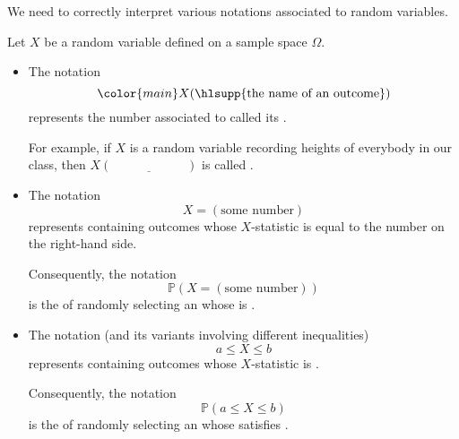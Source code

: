 \documentclass[../main.tex]{subfiles}
\begin{document}
We need to correctly interpret various notations associated to random variables.
\begin{definition} \label{def:random-variables}
  Let \(X\) be a random variable defined on a sample space \(\Omega\). 

  \begin{itemize}
    \item The notation 
      \[
        {\color{main} X(\text{\hlsupp{the name of an outcome}})}
      \] 
      represents the number associated to  called its .

      For example, if \(X\) is a random variable recording heights of everybody in our class, then \(X(\underline{\hspace{1in}})\) is \underline{\hspace{1.5cm}} called \underline{\hspace{2in}}.

    \item The notation 
      \[
        X = (\text{some number})
      \] 
      represents \underline{\hspace{2in}} containing outcomes whose \(X\)-statistic is equal to the number on the right-hand side. 

      Consequently, the notation
      \[
        \mathbb{P}(X = (\text{some number}))
      \]
      is the \underline{\hspace{1in}} of randomly selecting an \underline{\hspace{1in}} whose \underline{\hspace{1in}} is \underline{\hspace{2in}}.

    \item The notation (and its variants involving different inequalities)
      \[
        a \le X \le b
      \]
      represents \underline{\hspace{2in}} containing outcomes whose \(X\)-statistic is \underline{\hspace{5in}}.

      Consequently, the notation 
      \[
        \mathbb{P}(a \le X \le b)
      \]
      is the \underline{\hspace{1in}} of randomly selecting an \underline{\hspace{1in}} whose \underline{\hspace{1in}} satisfies \underline{\hspace{2in}}.
  \end{itemize}
\end{definition}
\end{document}
